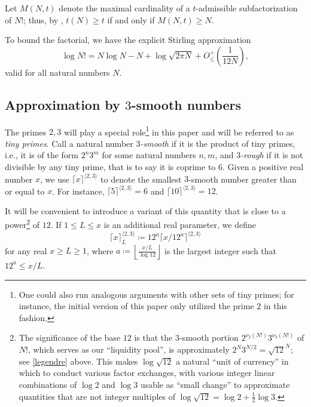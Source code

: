 \documentclass[10pt,a4paper,reqno]{amsart}
\numberwithin{equation}{section}
\theoremstyle{plain}
\theoremstyle{definition}
\begin{document}
Let $M(N,t)$ denote the maximal cardinality of a $t$-admissible subfactorization of $N!$; thus, by , $t(N) \geq t$ if and only if $M(N,t) \geq N$. 

To bound the factorial, we have the explicit Stirling approximation \cite{robbins}
\begin{equation}\label{stirling}
\log N! = N \log N - N + \log \sqrt{2\pi N} + O_\leq^+\left(\frac{1}{12N}\right),
\end{equation}
valid for all natural numbers $N$. 

\subsection{Approximation by \texorpdfstring{$3$}{3}-smooth numbers} 

The primes $2,3$ will play a special role\footnote{One could also run analogous arguments with other sets of tiny primes; for instance, the initial version \cite{tao} of this paper only utilized the prime $2$ in this fashion.} in this paper and will be referred to as \emph{tiny primes}. 
Call a natural number \emph{$3$-smooth} if it is the product of tiny primes, i.e., it is of the form $2^n 3^m$ for some natural numbers $n,m$, and \emph{$3$-rough} if it is not divisible by any tiny prime, that is to say it is coprime to $6$.  Given a positive real number $x$, we use $\lceil x \rceil^{\langle 2,3 \rangle}$ to denote the smallest $3$-smooth number greater than or equal to $x$.  For instance, $\lceil 5 \rceil^{\langle 2,3 \rangle} = 6$ and $\lceil 10 \rceil^{\langle 2,3 \rangle} = 12$.  

It will be convenient to introduce a variant of this quantity that is close to a power\footnote{The significance of the base $12$ is that the $3$-smooth portion $2^{\nu_2(N!)} 3^{\nu_3(N!)}$ of $N!$, which serves as our ``liquidity pool'', is approximately $2^N 3^{N/2} = \sqrt{12}^{N}$; see \eqref{legendre} above.  This makes $\log \sqrt{12}$ a natural ``unit of currency'' in which to conduct various factor exchanges, with various integer linear combinations of $\log 2$ and $\log 3$ usable as ``small change'' to approximate quantities that are not integer multiples of $\log \sqrt{12} = \log 2 + \frac{1}{2} \log 3$.} of $12$.  If $1 \leq L \leq x$ is an additional real parameter, we define
\begin{equation}\label{fancy-kappa-def}
  \lceil x \rceil^{\langle 2,3\rangle}_L \coloneqq 12^a \lceil x/12^a \rceil^{\langle 2,3 \rangle}
\end{equation}
for any real $x \geq L \geq 1$, where $a \coloneqq \left\lfloor \frac{x/L}{\log 12} \right\rfloor$ is the largest integer such that $12^a \leq x/L$.
\end{document}
